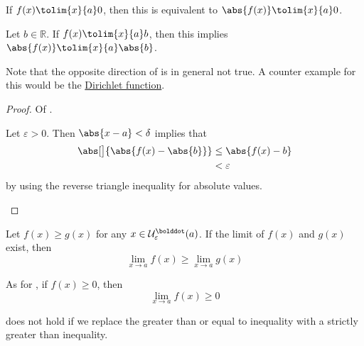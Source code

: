 \begin{thm}\label{thm-absolute-value-of-limit:1}
	If $f(x) \tolim{x}{a} 0$, then this is equivalent to
	$\abs{f(x)} \tolim{x}{a} 0$.
\end{thm}

\begin{thm}\label{thm-absolute-value-of-limit:2}
	Let $b\in\mathbb{R}$. If $f(x) \tolim{x}{a} b$, then
	this implies $\abs{f(x)} \tolim{x}{a} \abs{b}$.
\end{thm}

\begin{rem}
	Note that the opposite direction of 
	is in general not true. A counter example for this would be the
	\hyperref[def-dirichlet-function]{Dirichlet function}.
\end{rem}

\begin{proof}
	Of .
	\begin{flushleft}
		Let $\varepsilon>0$. Then $\abs{x-a}<\delta$ implies that
		\begin{align*}
			\abs[\big]{\abs{f(x) - \abs{b}}} & \leq \abs{f(x) - b} \\
			                                 & <\varepsilon
		\end{align*}
		by using the reverse triangle inequality for absolute values.
	\end{flushleft}
\end{proof}

\begin{thm}\label{thm-limit-monotonicity}
	Let $f(x) \geq g(x)$ for any $x\in\mathcal{U}_{\varepsilon}^{\bolddot}(a)$.
	If the limit of $f(x)$ and $g(x)$ exist, then
	\begin{equation*}
		\lim_{x \to a}f(x) \geq \lim_{x \to a}g(x)
	\end{equation*}
\end{thm}

\begin{rem}
	As for , if $f(x) \geq 0$,
	then
	\begin{equation*}
		\lim_{x \to a}f(x) \geq 0
	\end{equation*}
\end{rem}

\begin{rem}
	 does not hold if we replace the greater
	than or equal to inequality with a strictly greater than inequality.
\end{rem}

